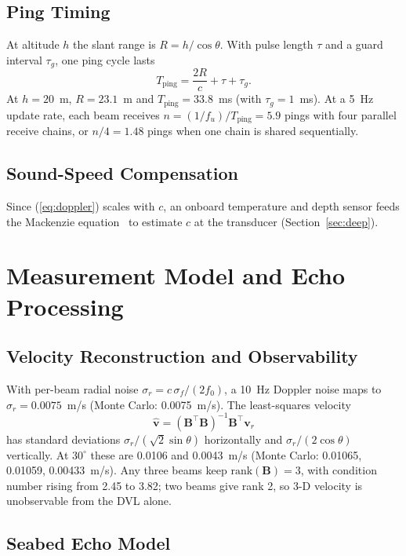 \documentclass[conference]{IEEEtran}
\newcommand{\vect}[1]{\mathbf{#1}}
\begin{document}
\subsection{Ping Timing}

At altitude $h$ the slant range is $R=h/\cos\theta$. With pulse length $\tau$ and a guard interval $\tau_g$, one ping cycle lasts
\begin{equation}
T_{\mathrm{ping}}=\frac{2R}{c}+\tau+\tau_g .
\end{equation}
At $h=20$~m, $R=23.1$~m and $T_{\mathrm{ping}}=33.8$~ms (with $\tau_g=1$~ms). At a 5~Hz update rate, each beam receives $n=(1/f_u)/T_{\mathrm{ping}}=5.9$ pings with four parallel receive chains, or $n/4=1.48$ pings when one chain is shared sequentially.

\subsection{Sound-Speed Compensation}

Since (\ref{eq:doppler}) scales with $c$, an onboard temperature and depth sensor feeds the Mackenzie equation~\cite{mackenzie1981} to estimate $c$ at the transducer (Section~\ref{sec:deep}).

\section{Measurement Model and Echo Processing}
\label{sec:measurement}

\subsection{Velocity Reconstruction and Observability}

With per-beam radial noise $\sigma_r=c\,\sigma_f/(2f_0)$, a 10~Hz Doppler noise maps to $\sigma_r=0.0075$~m/s (Monte Carlo: 0.0075~m/s). The least-squares velocity
\begin{equation}
\hat{\vect v}=(\vect B^\top\vect B)^{-1}\vect B^\top\vect v_r
\end{equation}
has standard deviations $\sigma_r/(\sqrt2\sin\theta)$ horizontally and $\sigma_r/(2\cos\theta)$ vertically. At $30^\circ$ these are 0.0106 and 0.0043~m/s (Monte Carlo: 0.01065, 0.01059, 0.00433~m/s). Any three beams keep $\mathrm{rank}(\vect B)=3$, with condition number rising from 2.45 to 3.82; two beams give rank 2, so 3-D velocity is unobservable from the DVL alone.

\subsection{Seabed Echo Model}
\end{document}
